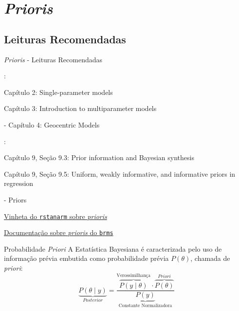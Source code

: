 \section{\textit{Prioris}}

\subsection{Leituras Recomendadas}
\begin{frame}{\textit{Prioris} - Leituras Recomendadas}
	\begin{vfilleditems}
		\item \textcite{gelman2013bayesian}:
		\begin{vfilleditems}
			\item Capítulo 2: Single-parameter models
			\item Capítulo 3: Introduction to multiparameter models
		\end{vfilleditems}
		\item \textcite{mcelreath2020statistical} - Capítulo 4: Geocentric Models
		\item \textcite{gelman2020regression}:
		\begin{vfilleditems}
			\item Capítulo 9, Seção 9.3: Prior information and Bayesian synthesis
			\item Capítulo 9, Seção 9.5: Uniform, weakly informative, and informative priors in regression
		\end{vfilleditems}
		\item \textcite{vandeschootBayesianStatisticsModelling2021}
		\item \textcite{storopoli2021estatisticabayesianaR} - Priors
		\item \href{http://mc-stan.org/rstanarm/articles/priors.html}{Vinheta do \texttt{rstanarm} sobre \textit{prioris}}
		\item \href{https://paul-buerkner.github.io/brms/reference/set_prior.html}{Documentação sobre \textit{prioris} do \texttt{brms}}
	\end{vfilleditems}
\end{frame}

\begin{frame}{Probabilidade \textit{Priori}}
	A Estatística Bayesiana é caracterizada pelo uso de informação prévia
	embutida como probabilidade prévia $P(\theta)$, chamada de \textit{priori}:
	$$
		\underbrace{P(\theta \mid y)}_{\textit{Posterior}} = \frac{\overbrace{P(y \mid  \theta)}^{\text{Verossimilhança}} \cdot \overbrace{P(\theta)}^{\textit{Priori}}}{\underbrace{P(y)}_{\text{Constante Normalizadora}}}
	$$
\end{frame}

